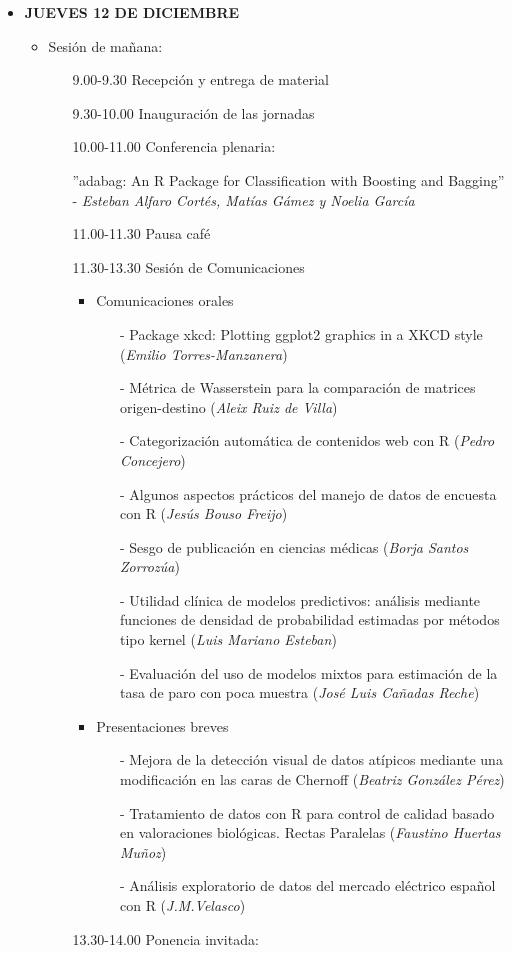 \begin{itemize}
\item \textsc{\textbf{JUEVES 12 DE DICIEMBRE}}
  \begin{itemize}
  \item Sesión de mañana:
    \begin{itemize}
    \item[]9.00-9.30 Recepción y entrega de material
    \item[]9.30-10.00 Inauguración de las jornadas
    \item[]10.00-11.00 Conferencia plenaria:

    ''adabag: An R Package for Classification with Boosting and Bagging'' - 
    \emph{Esteban Alfaro Cortés, Matías Gámez y Noelia García}
    \item[]11.00-11.30 Pausa café
    \item[]11.30-13.30 Sesión de Comunicaciones
    \begin{itemize}
    \item Comunicaciones orales
      \begin{enumerate}
      \item[-] Package xkcd: Plotting ggplot2 graphics in a XKCD style 
       (\emph{Emilio Torres-Manzanera})
      \item[-] Métrica de Wasserstein para la comparación de matrices 
      origen-destino  (\emph{Aleix Ruiz de Villa})
      \item[-]  Categorización automática de contenidos web con R  
      (\emph{Pedro Concejero})
      \item[-] Algunos aspectos prácticos del manejo de datos de encuesta con 
      R  (\emph{Jesús Bouso Freijo})
      \item[-] Sesgo de publicación en ciencias médicas  
      (\emph{Borja Santos Zorrozúa})
      \item[-] Utilidad clínica de modelos predictivos:  análisis mediante 
      funciones de densidad de probabilidad estimadas por métodos tipo 
      kernel   (\emph{Luis Mariano Esteban})
      \item[-] Evaluación del uso de modelos mixtos para estimación de la tasa 
      de paro con poca muestra  (\emph{José Luis Cañadas Reche})
      \end{enumerate}
    \item  Presentaciones breves
      \begin{enumerate}
      \item[-] Mejora de la detección visual de datos atípicos mediante una 
      modificación en las caras de Chernoff  (\emph{Beatriz González Pérez})
      \item[-] Tratamiento de datos con R para control de calidad basado en 
      valoraciones biológicas. Rectas Paralelas  (\emph{Faustino Huertas Muñoz})
      \item[-] Análisis exploratorio de datos del mercado eléctrico español con 
      R  (\emph{J.M.Velasco})
      \end{enumerate}
    \end{itemize}
    \item[]13.30-14.00 Ponencia invitada:


\end{itemize}
\end{itemize}
\end{itemize}
